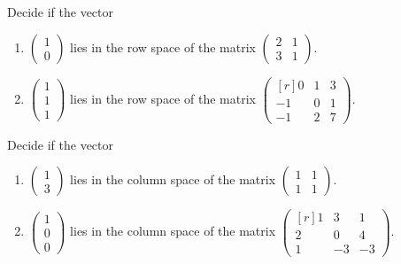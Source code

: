 \begin{exercise}{}{}
 Decide if the vector
 \begin{enumerate}[label=(\alph*)]
  \item
  $
   \begin{pmatrix}
    1\\
    0
   \end{pmatrix}
  $
  lies in the row space of the matrix
  $
   \begin{pmatrix}
    2 & 1\\
    3 & 1
   \end{pmatrix}.
  $
  \item 
   $
   \begin{pmatrix}
    1\\
    1\\
    1
   \end{pmatrix}
   $ lies in the row space of the matrix
   $
   \begin{pmatrix*}[r]
    0 & 1 & 3\\
    -1 & 0 & 1\\
    -1 & 2 & 7
   \end{pmatrix*}
   $.
 \end{enumerate}
\end{exercise}

\begin{exercise}{}{}
 Decide if the vector
 \begin{enumerate}[label=(\alph*)]
  \item
  $
   \begin{pmatrix}
    1\\
    3
   \end{pmatrix}
  $
  lies in the column space of the matrix
  $
   \begin{pmatrix}
    1 & 1\\
    1 & 1
   \end{pmatrix}.
  $
  \item 
   $
   \begin{pmatrix}
    1\\
    0\\
    0
   \end{pmatrix}
   $ lies in the column space of the matrix
   $
   \begin{pmatrix*}[r]
    1 & 3 & 1\\
    2 & 0 & 4\\
    1 & -3 & -3
   \end{pmatrix*}
   $.
 \end{enumerate}
\end{exercise}


